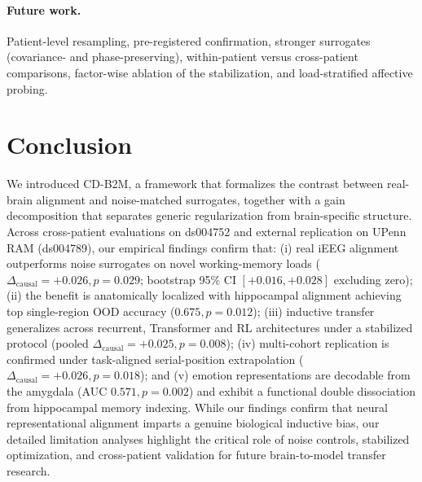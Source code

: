 \documentclass[conference]{IEEEtran}
\newcommand{\dcausal}{\Delta_{\mathrm{causal}}}
\begin{document}
\paragraph{Future work.}
Patient-level resampling, pre-registered confirmation, stronger surrogates (covariance- and phase-preserving), within-patient versus cross-patient comparisons, factor-wise ablation of the stabilization, and load-stratified affective probing.

\section{Conclusion}
We introduced CD-B2M, a framework that formalizes the contrast between real-brain alignment and noise-matched surrogates, together with a gain decomposition that separates generic regularization from brain-specific structure. Across cross-patient evaluations on ds004752 and external replication on UPenn RAM (ds004789), our empirical findings confirm that: (i) real iEEG alignment outperforms noise surrogates on novel working-memory loads ($\dcausal=+0.026, p=0.029$; bootstrap 95\% CI $[+0.016,+0.028]$ excluding zero); (ii) the benefit is anatomically localized with hippocampal alignment achieving top single-region OOD accuracy ($0.675, p=0.012$); (iii) inductive transfer generalizes across recurrent, Transformer and RL architectures under a stabilized protocol (pooled $\dcausal=+0.025, p=0.008$); (iv) multi-cohort replication is confirmed under task-aligned serial-position extrapolation ($\dcausal=+0.026, p=0.018$); and (v) emotion representations are decodable from the amygdala (AUC $0.571, p=0.002$) and exhibit a functional double dissociation from hippocampal memory indexing. While our findings confirm that neural representational alignment imparts a genuine biological inductive bias, our detailed limitation analyses highlight the critical role of noise controls, stabilized optimization, and cross-patient validation for future brain-to-model transfer research.
\end{document}
